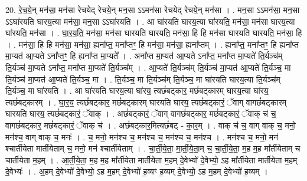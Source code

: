 \documentclass[17pt]{extarticle}
\begin{document}
20. रे॒च॒ये॒न् मन॑सा॒ मन॑सा रेचयेद् रेचये॒न् मन॒सा ऽऽमन॑सा रेचयेद् रेचये॒न् मन॑सा । . मन॒सा ऽऽमन॑सा॒ मन॒सा ऽऽघा॑रयति घारय॒त्या मन॑सा॒ मन॒सा ऽऽघा॑रयति । . आ घा॑रयति घारय॒त्या घा॑रयति॒ मन॑सा॒ मन॑सा घारय॒त्या घा॑रयति॒ मन॑सा । . घा॒र॒य॒ति॒ मन॑सा॒ मन॑सा घारयति घारयति॒ मन॑सा॒ हि हि मन॑सा घारयति घारयति॒ मन॑सा॒ हि । . मन॑सा॒ हि हि मन॑सा॒ मन॑सा॒ ह्यना᳚प्त॒ मना᳚प्तꣳ॒॒ हि मन॑सा॒ मन॑सा॒ ह्यना᳚प्तम् । . ह्यना᳚प्त॒ मना᳚प्तꣳ॒॒ हि ह्यना᳚प्त मा॒प्यत॑ आ॒प्यते ऽना᳚प्तꣳ॒॒ हि ह्यना᳚प्त मा॒प्यते᳚ । . अना᳚प्त मा॒प्यत॑ आ॒प्यते ऽना᳚प्त॒ मना᳚प्त मा॒प्यते॑ ति॒र्यञ्च॑म् ति॒र्यञ्च॑ मा॒प्यते ऽना᳚प्त॒ मना᳚प्त मा॒प्यते॑ ति॒र्यञ्च᳚म् । . आ॒प्यते॑ ति॒र्यञ्च॑म् ति॒र्यञ्च॑ मा॒प्यत॑ आ॒प्यते॑ ति॒र्यञ्च॒ मा ति॒र्यञ्च॑ मा॒प्यत॑ आ॒प्यते॑ ति॒र्यञ्च॒ मा । . ति॒र्यञ्च॒ मा ति॒र्यञ्च॑म् ति॒र्यञ्च॒ मा घा॑रयति घारय॒त्या ति॒र्यञ्च॑म् ति॒र्यञ्च॒ मा घा॑रयति । . आ घा॑रयति घारय॒त्या घा॑रय॒ त्यछं॑बट्कार॒ मछं॑बट्कारम् घारय॒त्या घा॑रय॒ त्यछं॑बट्कारम् । . घा॒र॒य॒ त्यछं॑बट्कार॒ मछं॑बट्कारम् घारयति घारय॒ त्यछं॑बट्कारं॒ ॅवाग् वागछं॑बट्कारम् घारयति घारय॒ त्यछं॑बट्कारं॒ ॅवाक् । . अछं॑बट्कारं॒ ॅवाग् वागछं॑बट्कार॒ मछं॑बट्कारं॒ ॅवाक् च॑ च॒ वागछं॑बट्कार॒ मछं॑बट्कारं॒ ॅवाक् च॑ । . अछं॑बट्कार॒मित्यछं॑बट् - का॒र॒म् । . वाक् च॑ च॒ वाग् वाक् च॒ मनो॒ मन॑श्च॒ वाग् वाक् च॒ मनः॑ । . च॒ मनो॒ मन॑श्च च॒ मन॑श्च च॒ मन॑श्च च॒ मन॑श्च । . मन॑श्च च॒ मनो॒ मन॑ श्चार्तीयेता मार्तीयेताम् च॒ मनो॒ मन॑ श्चार्तीयेताम् । . चा॒र्ती॒ये॒ता॒ मा॒र्ती॒ये॒ता॒म् च॒ चा॒र्ती॒ये॒ता॒ म॒ह म॒ह मा᳚र्तीयेताम् च चार्तीयेता म॒हम् । . आ॒र्ती॒ये॒ता॒ म॒ह म॒ह मा᳚र्तीयेता मार्तीयेता म॒हम् दे॒वेभ्यो॑ दे॒वेभ्यो॒ ऽह मा᳚र्तीयेता मार्तीयेता म॒हम् दे॒वेभ्यः॑ । . अ॒हम् दे॒वेभ्यो॑ दे॒वेभ्यो॒ ऽह म॒हम् दे॒वेभ्यो॑ ह॒व्यꣳ ह॒व्यम् दे॒वेभ्यो॒ ऽह म॒हम् दे॒वेभ्यो॑ ह॒व्यम् । \newline
\end{document}
